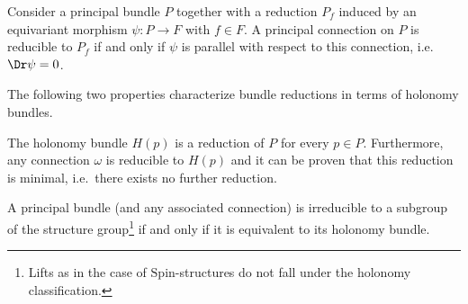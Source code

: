     \begin{property}\label{bundle:connection_reducibility}
        Consider a principal bundle $P$ together with a reduction $P_f$ induced by an equivariant morphism $\psi:P\rightarrow F$ with $f\in F$. A principal connection on $P$ is reducible to $P_f$ if and only if $\psi$ is parallel with respect to this connection, i.e.~$\Dr\psi=0$.
    \end{property}

    The following two properties characterize bundle reductions in terms of holonomy bundles.
    \begin{property}
        The holonomy bundle $H(p)$ is a reduction of $P$ for every $p\in P$. Furthermore, any connection $\omega$ is reducible to $H(p)$ and it can be proven that this reduction is minimal, i.e.~there exists no further reduction.
    \end{property}
    \begin{result}\label{bundle:reducible_holonomy}
        A principal bundle (and any associated connection) is irreducible to a subgroup of the structure group\footnote{Lifts as in the case of $\mathrm{Spin}$-structures do not fall under the holonomy classification.} if and only if it is equivalent to its holonomy bundle.
    \end{result}

